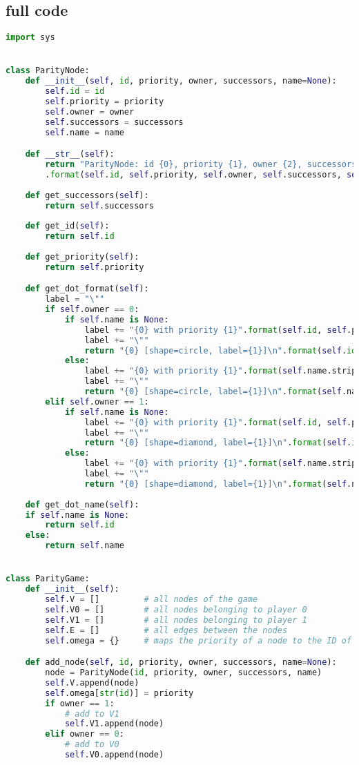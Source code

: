 \documentclass[12pt]{article}
\begin{document}
\subsection{full code}
\begin{lstlisting}[language=python]
import sys


class ParityNode:
	def __init__(self, id, priority, owner, successors, name=None):
		self.id = id
		self.priority = priority
		self.owner = owner
		self.successors = successors
		self.name = name

	def __str__(self):
		return "ParityNode: id {0}, priority {1}, owner {2}, successors {3}, name {4}"
		.format(self.id, self.priority, self.owner, self.successors, self.name)
	
	def get_successors(self):
		return self.successors
	
	def get_id(self):
		return self.id
	
	def get_priority(self):
		return self.priority

	def get_dot_format(self):
		label = "\""
		if self.owner == 0:
			if self.name is None:
				label += "{0} with priority {1}".format(self.id, self.priority)
				label += "\""
				return "{0} [shape=circle, label={1}]\n".format(self.id, label)
			else:
				label += "{0} with priority {1}".format(self.name.strip('"'), self.priority)
				label += "\""
				return "{0} [shape=circle, label={1}]\n".format(self.name, label)
		elif self.owner == 1:
			if self.name is None:
				label += "{0} with priority {1}".format(self.id, self.priority)
				label += "\""
				return "{0} [shape=diamond, label={1}]\n".format(self.id, label)
			else:
				label += "{0} with priority {1}".format(self.name.strip('"'), self.priority)
				label += "\""
				return "{0} [shape=diamond, label={1}]\n".format(self.name, label)
	
	def get_dot_name(self):
	if self.name is None:
		return self.id
	else:
		return self.name


class ParityGame:
	def __init__(self):
		self.V = []         # all nodes of the game
		self.V0 = []        # all nodes belonging to player 0
		self.V1 = []        # all nodes belonging to player 1
		self.E = []         # all edges between the nodes
		self.omega = {}     # maps the priority of a node to the ID of the node

	def add_node(self, id, priority, owner, successors, name=None):
		node = ParityNode(id, priority, owner, successors, name)
		self.V.append(node)
		self.omega[str(id)] = priority
		if owner == 1:
			# add to V1
			self.V1.append(node)
		elif owner == 0:
			# add to V0
			self.V0.append(node)
	

\end{lstlisting}
\end{document}
